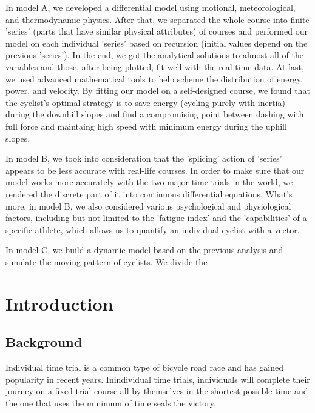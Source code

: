 \documentclass[12pt]{article}
\theoremstyle{definition}
\theoremstyle{remark}
\numberwithin{equation}{section}
\begin{document}
	In model A, we developed a differential model using motional, meteorological, and thermodynamic physics. After that, we separated the whole course into finite 'series' (parts that have similar physical attributes) of courses and performed our model on each individual 'series' based on recursion (initial values depend on the previous 'series'). In the end, we got the analytical solutions to almost all of the variables and those, after being plotted, fit well with the real-time data. At last, we used advanced mathematical tools to help scheme the distribution of energy, power, and velocity. By fitting our model on a self-designed course, we found that the cyclist's optimal strategy is to save energy (cycling purely with inertia) during the downhill slopes and find a compromising point between dashing with full force and maintaing high speed with minimum energy during the uphill slopes.

	In model B, we took into consideration that the 'splicing' action of 'series' appears to be less accurate with real-life courses. In order to make sure that our model works more accurately with the two major time-trials in the world, we rendered the discrete part of it into continuous differential equations. What's more, in model B, we also considered various psychological and physiological factors, including but not limited to the 'fatigue index' and the 'capabilities' of a specific athlete, which allows us to quantify an individual cyclist with a vector.

	In model C, we build a dynamic model based on the previous analysis and simulate the moving pattern of cyclists. We divide the


	\newpage
	\clearpage
	\thispagestyle{empty}
	\tableofcontents %
	\newpage
	\pagestyle{fancy}
	\setcounter{page}{1}

	\newpage
	\section{Introduction}
	\subsection{Background}
	Individual time trial is a common type of bicycle road race and has gained popularity in recent years. Inindividual time trials, individuals will complete their journey on a fixed trial course all by themselves in the shortest possible time and the one that uses the minimum of time seals the victory.
\end{document}

